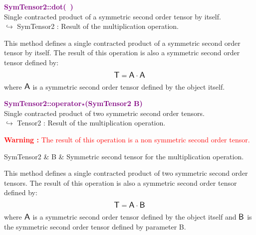 \textcolor{purple}{\textbf{SymTensor2::dot(~)}}\label{SymTensor2::dot()}\\
Single contracted product of a symmetric second order tensor by itself.\\ \hspace*{10mm}$\hookrightarrow$ SymTensor2 : Result of the multiplication operation.

This method defines a single contracted product of a symmetric second order tensor by itself.
The result of this operation is also a symmetric second order tensor defined by:
\begin{equation*}
\mbox{\large\ensuremath{\mathsf{T}}} = \mbox{\large\ensuremath{\mathsf{A}}} \cdot \mbox{\large\ensuremath{\mathsf{A}}}
\end{equation*}
where $\mbox{\large\ensuremath{\mathsf{A}}}$ is a symmetric second order tensor defined by the object itself.

\textcolor{purple}{\textbf{SymTensor2::operator$\star$(SymTensor2 B)}}\label{SymTensor2::operator*(SymTensor2 B)}\\
Single contracted product of two symmetric second order tensors.\\ \hspace*{10mm}$\hookrightarrow$ Tensor2 : Result of the multiplication operation.

\hspace*{10mm}\textcolor{red}{\textbf{Warning :}  The result of this operation is a non symmetric second order tensor.}

\begin{tcolorbox}[width=\textwidth,myArgs,tabularx={ll|R}]
SymTensor2 & B & Symmetric second tensor for the multiplication operation.
\end{tcolorbox}

This method defines a single contracted product of two symmetric second order tensors.
The result of this operation is also a symmetric second order tensor defined by:
\begin{equation*}
\mbox{\large\ensuremath{\mathsf{T}}} = \mbox{\large\ensuremath{\mathsf{A}}} \cdot \mbox{\large\ensuremath{\mathsf{B}}}
\end{equation*}
where $\mbox{\large\ensuremath{\mathsf{A}}}$ is a symmetric second order tensor defined by the object itself and $\mbox{\large\ensuremath{\mathsf{B}}}$ is the symmetric second order tensor defined by parameter B.

